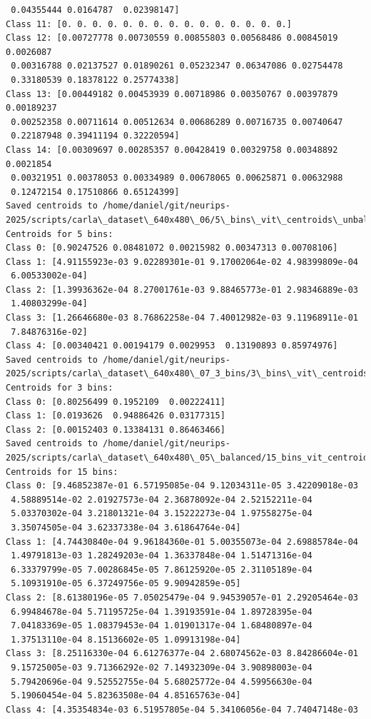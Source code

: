 \begin{verbatim}
 0.04355444 0.0164787  0.02398147]
Class 11: [0. 0. 0. 0. 0. 0. 0. 0. 0. 0. 0. 0. 0. 0. 0.]
Class 12: [0.00727778 0.00730559 0.00855803 0.00568486 0.00845019 0.0026087
 0.00316788 0.02137527 0.01890261 0.05232347 0.06347086 0.02754478
 0.33180539 0.18378122 0.25774338]
Class 13: [0.00449182 0.00453939 0.00718986 0.00350767 0.00397879 0.00189237
 0.00252358 0.00711614 0.00512634 0.00686289 0.00716735 0.00740647
 0.22187948 0.39411194 0.32220594]
Class 14: [0.00309697 0.00285357 0.00428419 0.00329758 0.00348892 0.0021854
 0.00321951 0.00378053 0.00334989 0.00678065 0.00625871 0.00632988
 0.12472154 0.17510866 0.65124399]
Saved centroids to /home/daniel/git/neurips-2025/scripts/carla\_dataset\_640x480\_06/5\_bins\_vit\_centroids\_unbalanced.npy
Centroids for 5 bins:
Class 0: [0.90247526 0.08481072 0.00215982 0.00347313 0.00708106]
Class 1: [4.91155923e-03 9.02289301e-01 9.17002064e-02 4.98399809e-04
 6.00533002e-04]
Class 2: [1.39936362e-04 8.27001761e-03 9.88465773e-01 2.98346889e-03
 1.40803299e-04]
Class 3: [1.26646680e-03 8.76862258e-04 7.40012982e-03 9.11968911e-01
 7.84876316e-02]
Class 4: [0.00340421 0.00194179 0.0029953  0.13190893 0.85974976]
Saved centroids to /home/daniel/git/neurips-2025/scripts/carla\_dataset\_640x480\_07_3_bins/3\_bins\_vit\_centroids\_unbalanced.npy
Centroids for 3 bins:
Class 0: [0.80256499 0.1952109  0.00222411]
Class 1: [0.0193626  0.94886426 0.03177315]
Class 2: [0.00152403 0.13384131 0.86463466]
Saved centroids to /home/daniel/git/neurips-2025/scripts/carla\_dataset\_640x480\_05\_balanced/15_bins_vit_centroids\_balanced.npy
Centroids for 15 bins:
Class 0: [9.46852387e-01 6.57195085e-04 9.12034311e-05 3.42209018e-03
 4.58889514e-02 2.01927573e-04 2.36878092e-04 2.52152211e-04
 5.03370302e-04 3.21801321e-04 3.15222273e-04 1.97558275e-04
 3.35074505e-04 3.62337338e-04 3.61864764e-04]
Class 1: [4.74430840e-04 9.96184360e-01 5.00355073e-04 2.69885784e-04
 1.49791813e-03 1.28249203e-04 1.36337848e-04 1.51471316e-04
 6.33379799e-05 7.00286845e-05 7.86125920e-05 2.31105189e-04
 5.10931910e-05 6.37249756e-05 9.90942859e-05]
Class 2: [8.61380196e-05 7.05025479e-04 9.94539057e-01 2.29205464e-03
 6.99484678e-04 5.71195725e-04 1.39193591e-04 1.89728395e-04
 7.04183369e-05 1.08379453e-04 1.01901317e-04 1.68480897e-04
 1.37513110e-04 8.15136602e-05 1.09913198e-04]
Class 3: [8.25116330e-04 6.61276377e-04 2.68074562e-03 8.84286604e-01
 9.15725005e-03 9.71366292e-02 7.14932309e-04 3.90898003e-04
 5.79420696e-04 9.52552755e-04 5.68025772e-04 4.59956630e-04
 5.19060454e-04 5.82363508e-04 4.85165763e-04]
Class 4: [4.35354834e-03 6.51957805e-04 5.34106056e-04 7.74047148e-03

\end{verbatim}
